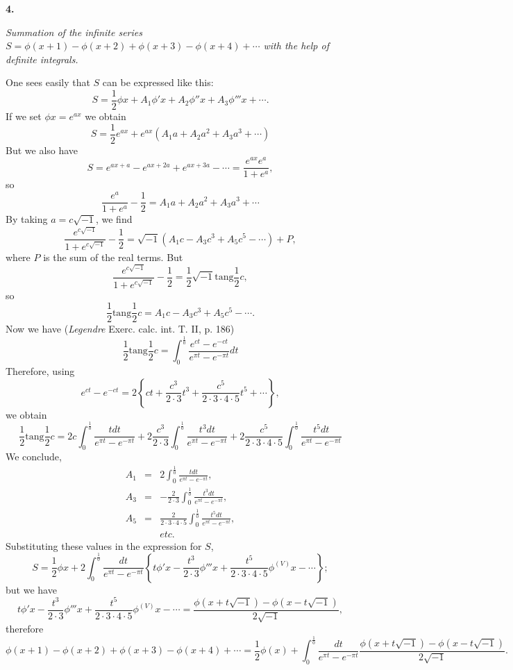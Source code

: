 \documentclass[12pt]{article}
\begin{document}
\begin{center}
\textbf{4.}

\emph{ Summation of the infinite series $S = \phi (x+1) - \phi (x+2) + \phi(x+3) - \phi(x+4) + \cdots $ with the help of definite integrals. }
\end{center}

One sees easily that $S$ can be expressed like this:
\[ S = \frac{1}{2} \phi x + A_1 \phi' x + A_2 \phi'' x + A_3 \phi'''x + \cdots .\]
If we set $\phi x = e^{ax}$ we obtain
\[ S = \frac{1}{2} e^{ax} + e^{ax}\left(A_1a + A_2 a^2 + A_3 a^3 + \cdots \right)\]
But we also have 
\[ S = e^{ax+a} - e^{ax + 2a} + e^{ax + 3a} - \cdots = \frac{e^{ax}e^a}{1+e^a}, \]
so
\[ \frac{e^a}{1+e^a} - \frac{1}{2} = A_1 a + A_2 a^2 + A_3 a^3 + \cdots \]
By taking $a = c \sqrt{-1}$, we find 
\[ \frac{e^{c \sqrt{-1}}}{1+e^{c \sqrt{-1}}} - \frac{1}{2} = \sqrt{-1} \left( A_1 c - A_3 c^3 + A_5 c^5 - \cdots\right) + P, \]
where $P$ is the sum of the real terms.  But 
\[ \frac{e^{c \sqrt{-1}}}{1+e^{c\sqrt{-1}}} - \frac{1}{2} = \frac{1}{2} \sqrt{-1} \mathrm{tang} \frac{1}{2} c ,\]
so 
\[ \frac{1}{2} \mathrm{tang} \frac{1}{2} c = A_1 c - A_3 c^3 + A_5 c^5 - \cdots .\]
Now we have (\emph{Legendre} Exerc. calc. int. T. II, p. 186)
\[ \frac{1}{2} \mathrm{tang} \frac{1}{2} c = \int_0^{\frac{1}{0}} \frac{e^{ct} - e^{-ct}}{e^{\pi t} - e^{-\pi t}} dt \]
Therefore, using
\[ e^{ct} - e^{-ct} = 2\left\{ct + \frac{c^3}{2\cdot 3} t^3 + \frac{c^5}{2 \cdot 3 \cdot 4 \cdot 5} t^5 + \cdots \right\}, \]
we obtain
\[ \frac{1}{2} \mathrm{tang} \frac{1}{2} c = 2c \int_0^{\frac{1}{0}} \frac{t dt}{e^{\pi t} - e^{-\pi t}} + 2 \frac{c^3}{2 \cdot 3} \int_0^{\frac{1}{0}} \frac{t^3 dt}{e^{\pi t} - e^{-\pi t}} + 2 \frac{c^5}{2 \cdot 3 \cdot 4\cdot 5} \int_0^{\frac{1}{0}} \frac{t^5dt}{e^{\pi t} - e^{-\pi t}} \]
We conclude,
\begin{eqnarray*} A_1 &=& 2 \int_0^{\frac{1}{0}} \frac{t dt}{e^{\pi t} - e^{-\pi t}} , \\
A_3 &=& - \frac{2}{2 \cdot 3} \int_0^{\frac{1}{0}} \frac{t^3dt}{e^{\pi t} - e^{-\pi t}} , \\
A_5 &=& \frac{2}{2 \cdot 3 \cdot 4 \cdot 5} \int_0^{\frac{1}{0}} \frac{t^5 dt}{e^{\pi t} - e^{-\pi t}} , \\
 && etc. 
\end{eqnarray*}
Substituting these values in the expression for $S$, 
\[ S = \frac{1}{2} \phi x + 2 \int_0^{\frac{1}{0}} \frac{dt}{e^{\pi t} - e^{-\pi t}} \left\{ t \phi'x - \frac{t^3}{2 \cdot 3} \phi''' x + \frac{t^5}{2 \cdot 3 \cdot 4 \cdot 5} \phi^{(V)}x - \cdots \right \}; \]
but we have 
\[ t \phi'x - \frac{t^3}{2 \cdot 3} \phi''' x + \frac{t^5}{2 \cdot 3 \cdot 4 \cdot 5} \phi^{(V)}x - \cdots = \frac{\phi(x+t\sqrt{-1}) - \phi(x - t \sqrt{-1})}{2 \sqrt{-1}}, \]
therefore
\[ \phi(x+1) - \phi (x+2) + \phi (x+3) - \phi (x+4) + \cdots = \frac{1}{2} \phi(x) + \int_0^{\frac{1}{0}} \frac{dt}{e^{\pi t} - e^{-\pi t}} \frac{ \phi(x + t \sqrt{-1}) - \phi(x-t\sqrt{-1})}{2 \sqrt{-1}} .\]
\end{document}
